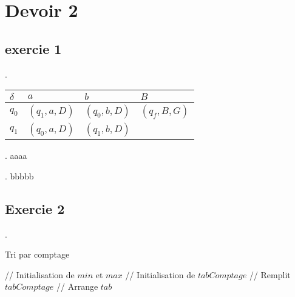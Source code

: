 \documentclass[french, a4paper, notitlepage, 12pt]{report}
\begin{document}
\chapter*{Devoir 2}
\section*{exercie 1}
.

\begin{center}
  \begin{tabular}{C{0.5cm}|C{1.5cm} C{1.5cm} C{1.5cm}}
    $\delta$ & $a$           & $b$           & $B$           \\ \hline
    $q_0$    & $(q_1, a, D)$ & $(q_0, b, D)$ & $(q_f, B, G)$ \\
    $q_1$    & $(q_0, a, D)$ & $(q_1, b, D)$ &               \\
  \end{tabular}
\end{center}

.
aaaa

.
bbbbb

\section*{Exercie 2}

\newpage
{}.
\begin{algorithm}[H]
  \caption{Tri par comptage}
  \begin{algorithmic}[1]
    \Statex
     // Initialisation de $min$ et $max$
    \EndIf
    \EndIf
    \EndFor
     // Initialisation de $tabComptage$
    \EndFor
     // Remplit $tabComptage$
    \EndFor
     // Arrange $tab$
    \EndFor
    \EndFor
    \State {}
    \EndFunction
  \end{algorithmic}
\end{algorithm}
\end{document}
